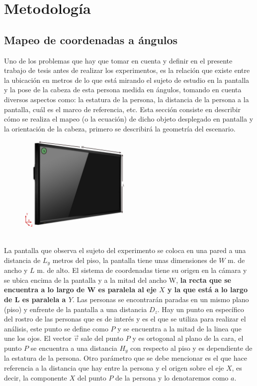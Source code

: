 \chapter{Metodología}
    \section{Mapeo de coordenadas a ángulos}
    Uno de los problemas que hay que tomar en cuenta y definir en el presente trabajo de tesis antes de realizar los experimentos, es la relación que existe entre la ubicación en metros de lo que está mirando el sujeto de estudio en la pantalla y la pose de la cabeza de esta persona medida en ángulos, tomando en cuenta diversos aspectos como: la estatura de la persona, la distancia de la persona a la pantalla, cuál es el marco de referencia, etc. Esta sección consiste en describir cómo se realiza el mapeo (o la ecuación) de dicho objeto desplegado en pantalla y la orientación de la cabeza, primero se describirá la geometría del escenario. 
    \begin{figure}[htbp]
    	\centering
    	\includegraphics[width=0.5\textwidth]{./pictures/pantalla2}
    	\caption{}\label{fig: figura}
    \end{figure}   
    \\La pantalla que observa el sujeto del experimento se coloca en una pared a una distancia de $L_y$ metros del piso, la pantalla tiene unas dimensiones de $W$ m. de ancho y $L$ m. de alto. El sistema de coordenadas tiene su origen en la cámara y se ubica  encima de la pantalla y a la mitad del ancho W, \textbf{la recta que se encuentra a lo largo de W es paralela al eje $X$ y la que está a lo largo de L es paralela a $Y$}. Las personas se encontrarán paradas en un mismo plano (piso) y enfrente de la pantalla a una distancia $D_z$. Hay un punto en específico del rostro de las personas que es de interés y es el que se utiliza para realizar el análisis, este punto se define como $P$ y se encuentra a la mitad de la linea que une los ojos. El vector $\vec v$ sale del punto $P$ y es ortogonal al plano de la cara, el punto $P$ se encuentra a una distancia $H_y$ con respecto al piso y es dependiente de la estatura de la persona. Otro parámetro que se debe mencionar es el que hace referencia a la distancia que hay entre la persona y el origen sobre el eje $X$, es decir, la componente $X$ del punto $P$ de la persona y lo denotaremos como $a$.%

